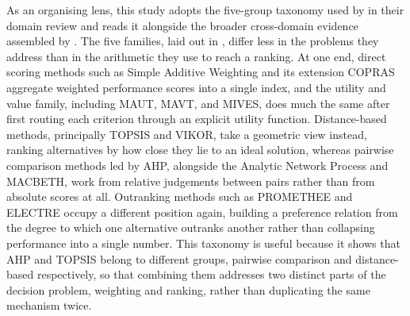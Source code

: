 As an organising lens, this study adopts the five-group taxonomy used by
\textcite{villalba_review_2024} in their domain review and reads it alongside the broader
cross-domain evidence assembled by \textcite{basilio_systematic_2022}. The five families,
laid out in , differ less in the problems they address than in the
arithmetic they use to reach a ranking. At one end, direct scoring methods such as Simple
Additive Weighting and its extension COPRAS aggregate weighted performance scores into a
single index, and the utility and value family, including MAUT, MAVT, and MIVES, does much
the same after first routing each criterion through an explicit utility function.
Distance-based methods, principally TOPSIS and VIKOR, take a geometric view instead,
ranking alternatives by how close they lie to an ideal solution, whereas pairwise
comparison methods led by AHP, alongside the Analytic Network Process and MACBETH, work
from relative judgements between pairs rather than from absolute scores at all. Outranking
methods such as PROMETHEE and ELECTRE occupy a different position again, building a
preference relation from the degree to which one alternative outranks another rather than
collapsing performance into a single number. This taxonomy is useful because it shows that
AHP and TOPSIS belong to different groups, pairwise comparison and distance-based
respectively, so that combining them addresses two distinct parts of the decision problem,
weighting and ranking, rather than duplicating the same mechanism twice.

